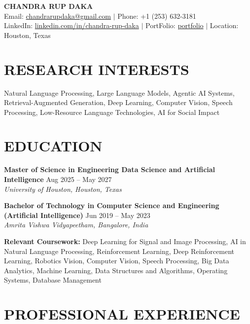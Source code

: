 \documentclass[11pt,a4paper]{article}
\newcommand{\CVSubheading}[4]{
  \vspace{2pt}
  \textbf{#1} \hfill #2 \\
  \textit{#3} \hfill \textit{#4}
  \vspace{3pt}
}
\begin{document}
\begin{center}
    {\Huge \textbf{CHANDRA RUP DAKA}} \\[5pt]
    Email: \href{mailto:chandrarupdaka@gmail.com}{chandrarupdaka@gmail.com} $|$ 
    Phone: +1 (253) 632-3181 \\
    LinkedIn: \href{https://linkedin.com/in/chandra-rup-daka}{linkedin.com/in/chandra-rup-daka} $|$ 
    PortFolio: \href{https://chandrarup.github.io/Portfolio_New/}{portfolio} $|$ 
    Location: Houston, Texas
\end{center}

\section{RESEARCH INTERESTS}
Natural Language Processing, Large Language Models, Agentic AI Systems, Retrieval-Augmented Generation, Deep Learning, Computer Vision, Speech Processing, Low-Resource Language Technologies, AI for Social Impact

\section{EDUCATION}

\CVSubheading
{Master of Science in Engineering Data Science and Artificial Intelligence}
{Aug 2025 -- May 2027}
{University of Houston, Houston, Texas}
{}

\CVSubheading
{Bachelor of Technology in Computer Science and Engineering (Artificial Intelligence)}
{Jun 2019 -- May 2023}
{Amrita Vishwa Vidyapeetham, Bangalore, India}
{}

\textbf{Relevant Coursework:} Deep Learning for Signal and Image Processing, AI in Natural Language Processing, Reinforcement Learning, Deep Reinforcement Learning, Robotics Vision, Computer Vision, Speech Processing, Big Data Analytics, Machine Learning, Data Structures and Algorithms, Operating Systems, Database Management

\section{PROFESSIONAL EXPERIENCE}
\end{document}
